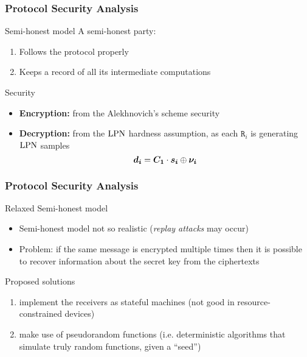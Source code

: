 \begin{frame}
 \frametitle{Protocol Security Analysis }

  \begin{block}{Semi-honest model}
    A semi-honest party:
    \begin{enumerate}
      \item Follows the protocol properly
      \item Keeps a record of all its intermediate computations
    \end{enumerate}
  \end{block}

  \begin{block}{Security}
  \begin{itemize}
    \item<2-> \textbf{Encryption:} from the Alekhnovich's scheme security
    \item<3-> \textbf{Decryption:} from the $\mathrm{LPN}$ hardness assumption, as each $\mathtt{R}_i$ is generating $\mathrm{LPN}$ samples
    \[
     \boldsymbol{d_i} = \boldsymbol{C_1} \cdot \boldsymbol{s_i} \mathbin{\oplus} \boldsymbol{\nu_{i}} 
    \]

  \end{itemize}
  \end{block}
  
\end{frame}

\begin{frame}
 \frametitle{Protocol Security Analysis }

 \begin{block}{Relaxed Semi-honest model}
   \begin{itemize}[<+->]
    \item Semi-honest model not so realistic (\emph{replay attacks} may occur)
    \item \alert{Problem:} if the same message is encrypted multiple times then it is possible to recover information about the secret key from the ciphertexts\\
   \end{itemize}
  \end{block}

 \begin{block}{Proposed solutions}
    \begin{enumerate}
     \item<3-> implement the receivers as \alert{stateful} machines (not good in resource-constrained devices)
     \item<4-> make use of \alert{pseudorandom functions} (i.e. deterministic algorithms that simulate truly random functions, given a ``seed'')
    \end{enumerate}
 \end{block}
 
\end{frame}


